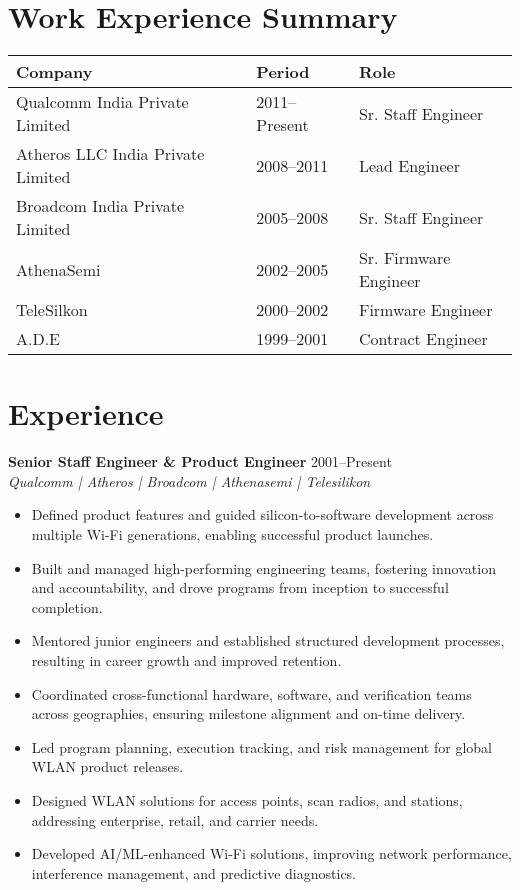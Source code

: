 \documentclass[a4paper,11pt]{article}
\begin{document}
\section*{Work Experience Summary}
\begin{flushleft}
\renewcommand{\arraystretch}{1.3}
\begin{tabularx}{\textwidth}{@{} l l X @{}}
\textbf{Company} & \textbf{Period} & \textbf{Role} \\
\hline
Qualcomm India Private Limited & 2011--Present & Sr. Staff Engineer \\
Atheros LLC India Private Limited & 2008--2011 & Lead Engineer \\
Broadcom India Private Limited & 2005--2008 & Sr. Staff Engineer \\
AthenaSemi & 2002--2005 & Sr. Firmware Engineer \\
TeleSilkon & 2000--2002 & Firmware Engineer \\
A.D.E & 1999--2001 & Contract Engineer \\
\end{tabularx}
\end{flushleft}


\section*{Experience}
\textbf{Senior Staff Engineer \& Product Engineer} \hfill 2001--Present \\
\textit{Qualcomm | Atheros | Broadcom | Athenasemi | Telesilikon} \\
\begin{itemize}
    \item Defined product features and guided silicon-to-software development across multiple Wi-Fi generations, enabling successful product launches.
    \item Built and managed high-performing engineering teams, fostering innovation and accountability, and drove programs from inception to successful completion.
    \item Mentored junior engineers and established structured development processes, resulting in career growth and improved retention.
    \item Coordinated cross-functional hardware, software, and verification teams across geographies, ensuring milestone alignment and on-time delivery.
    \item Led program planning, execution tracking, and risk management for global WLAN product releases.
    \item Designed WLAN solutions for access points, scan radios, and stations, addressing enterprise, retail, and carrier needs.
    \item Developed AI/ML-enhanced Wi-Fi solutions, improving network performance, interference management, and predictive diagnostics.
\end{itemize}
\end{document}
